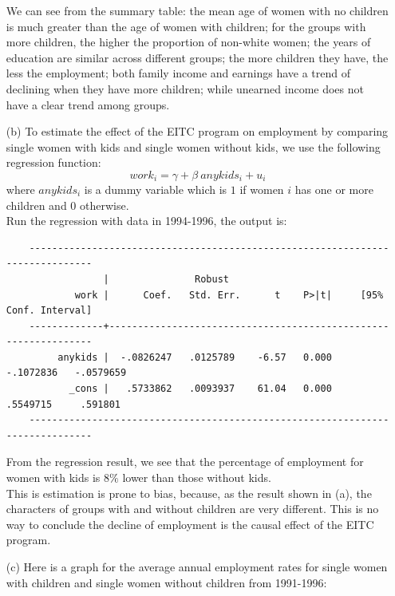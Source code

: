 \documentclass{article}
\begin{document}
\begin{enumerate}
We can see from the summary table: the mean age of women with no children is much greater than the  
age of women with children; for the groups with more children, the higher the proportion of non-white 
women; the years of education are similar across different groups; the more children they have, 
the less the employment; both family income and earnings have a trend of declining when they 
have more children; while unearned income does not have a clear trend among groups. \\

\item[(b)] To estimate the effect of the EITC program on employment by comparing single women 
with kids and single women without kids, we use the following regression function:
$$ work_i = \gamma + \beta\ anykids_i + u_i $$
where $anykids_i$ is a dummy variable which is $1$ if women $i$ has one or more children
and $0$ otherwise. \\

Run the regression with data in 1994-1996, the output is:

    \begin{verbatim}
    ------------------------------------------------------------------------------
                 |               Robust
            work |      Coef.   Std. Err.      t    P>|t|     [95% Conf. Interval]
    -------------+----------------------------------------------------------------
         anykids |  -.0826247   .0125789    -6.57   0.000    -.1072836   -.0579659
           _cons |   .5733862   .0093937    61.04   0.000     .5549715     .591801
    ------------------------------------------------------------------------------    
    \end{verbatim}

From the regression result, we see that the percentage of employment for women with kids is 
$8\%$ lower than those without kids. \\

This is estimation is prone to bias, because, as the result shown in (a), the characters of 
groups with and without children are very different. This is no way to conclude the decline 
of employment is the causal effect of the EITC program. \\


\item[(c)] Here is a graph for the average annual employment rates for single women with 
children and single women without children from 1991-1996:


\end{enumerate}
\end{document}
